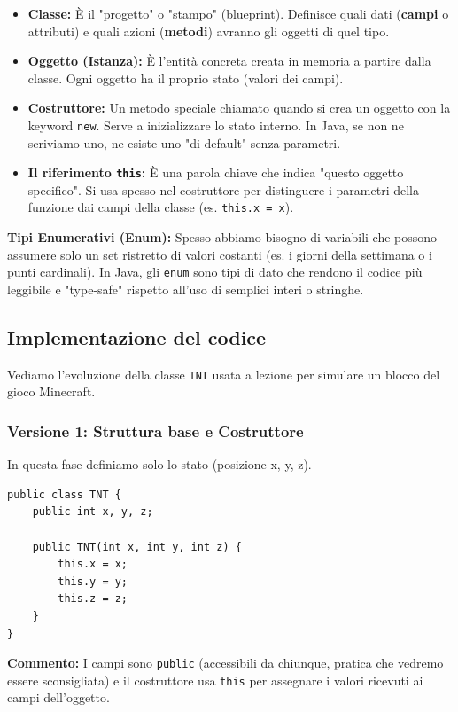 \documentclass[12pt, a4paper]{article}
\begin{document}
\begin{itemize}
    \item \textbf{Classe:} È il "progetto" o "stampo" (blueprint). Definisce quali dati (\textbf{campi} o attributi) e quali azioni (\textbf{metodi}) avranno gli oggetti di quel tipo.
    \item \textbf{Oggetto (Istanza):} È l'entità concreta creata in memoria a partire dalla classe. Ogni oggetto ha il proprio stato (valori dei campi).
    \item \textbf{Costruttore:} Un metodo speciale chiamato quando si crea un oggetto con la keyword \texttt{new}. Serve a inizializzare lo stato interno. In Java, se non ne scriviamo uno, ne esiste uno "di default" senza parametri.
    \item \textbf{Il riferimento \texttt{this}:} È una parola chiave che indica "questo oggetto specifico". Si usa spesso nel costruttore per distinguere i parametri della funzione dai campi della classe (es. \texttt{this.x = x}).
\end{itemize}

\textbf{Tipi Enumerativi (Enum):} Spesso abbiamo bisogno di variabili che possono assumere solo un set ristretto di valori costanti (es. i giorni della settimana o i punti cardinali). In Java, gli \texttt{enum} sono tipi di dato che rendono il codice più leggibile e "type-safe" rispetto all'uso di semplici interi o stringhe.

\subsection{Implementazione del codice}
Vediamo l'evoluzione della classe \texttt{TNT} usata a lezione per simulare un blocco del gioco Minecraft.

\subsubsection{Versione 1: Struttura base e Costruttore}
In questa fase definiamo solo lo stato (posizione x, y, z).
\begin{verbatim}
public class TNT {
    public int x, y, z;

    public TNT(int x, int y, int z) {
        this.x = x;
        this.y = y;
        this.z = z;
    }
}
\end{verbatim}
\textbf{Commento:} I campi sono \texttt{public} (accessibili da chiunque, pratica che vedremo essere sconsigliata) e il costruttore usa \texttt{this} per assegnare i valori ricevuti ai campi dell'oggetto.
\end{document}
